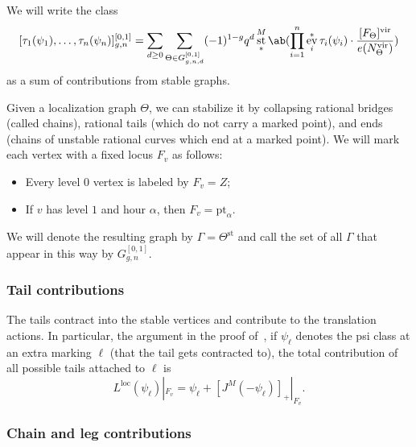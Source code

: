 \documentclass[10pt]{amsart}
\theoremstyle{definition}
\theoremstyle{remark}
\theoremstyle{plain}
\theoremstyle{definition}
\theoremstyle{remark}
\newcommand{\mr}[1]{\mathrm{#1}}
\newcommand{\1}{\mathbf{1}}
\newcommand{\2}{\mathbf{2}}
\newcommand{\3}{\mathbf{3}}
\newcommand{\vir}{\mr{vir}}
\newcommand{\pt}{\mr{pt}}
\newcommand{\loc}{\mr{loc}}
\DeclareMathOperator{\ev}{ev}
\DeclareMathOperator{\st}{st}
\numberwithin{equation}{section}
\begin{document}
We will write the class
\[ [\tau_1(\psi_1), \ldots, \tau_n(\psi_n)]_{g,n}^{[0,1]} = \sum_{d \geq 0} \sum_{\Theta \in G_{g,n,d}^{[0,1]}} (-1)^{1-g} q^d \st_*^M \ab( \prod_{i=1}^n \ev_i^* \tau_i(\psi_i) \cdot \frac{[F_{\Theta}]^{\vir}}{e(N_{\Theta}^{\vir})} ) \]
as a sum of contributions from stable graphs.

Given a localization graph $\Theta$, we can stabilize it by collapsing rational bridges (called chains), rational tails (which do not carry a marked point), and ends (chains of unstable rational curves which end at a marked point). We will mark each vertex with a fixed locus $F_v$ as follows:
\begin{itemize}
    \item Every level $0$ vertex is labeled by $F_v = Z$;
    \item If $v$ has level $1$ and hour $\alpha$, then $F_v = \pt_{\alpha}$.
\end{itemize}
We will denote the resulting graph by $\Gamma = \Theta^{\st}$ and call the set of all $\Gamma$ that appear in this way by $G_{g,n}^{[0,1]}$.

\subsubsection{Tail contributions}%
\label{ssub:Tail contributions}

The tails contract into the stable vertices and contribute to the translation actions. In particular, the argument in the proof of~, if $\psi_{\ell}$ denotes the psi class at an extra marking $\ell$ (that the tail gets contracted to), the total contribution of all possible tails attached to $\ell$ is
\[ L^{\loc}(\psi_{\ell})|_{F_v} = \psi_{\ell} + [J^M(-\psi_{\ell})]_+|_{F_v}. \]

\subsubsection{Chain and leg contributions}%
\label{ssub:Chain contributions}
\end{document}
